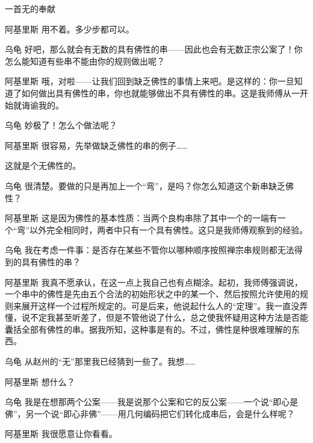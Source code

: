 \begin{dialog}{一首无的奉献\label{abcd}}
\begin{dialogue}
\item[阿基里斯]用不着。多少步都可以。

\item[乌龟]好吧，那么就会有无数的具有佛性的串——因此也会有无数正宗公案了！你怎么能知道有些串不能由你的规则做出呢？

\item[阿基里斯]哦，对啦——让我们回到缺乏佛性的事情上来吧。是这样的：你一旦知道了如何做出具有佛性的串，你也就能够做出不具有佛性的串。这是我师傅从一开始就诲谕我的。

\item[乌龟]妙极了！怎么个做法呢？

\item[阿基里斯]很容易，先举做缺乏佛性的串的例子……


这就是个无佛性的。

\item[乌龟]很清楚。要做的只是再加上一个“弯”，是吗？你怎么知道这个新串缺乏佛性？

\item[阿基里斯]这是因为佛性的基本性质：当两个良构串除了其中一个的一端有一个“弯”以外完全相同时，两者中只有一个具有佛性。这只是我师傅观察到的经验。

\item[乌龟]我在考虑一件事：是否存在某些不管你以哪种顺序按照禅宗串规则都无法得到的具有佛性的串？

\item[阿基里斯]我真不愿承认，在这一点上我自己也有点糊涂。起初，我师傅强调说，一个串中的佛性是先由五个合法的初始形状之中的某一个、然后按照允许使用的规则来展开这样一个过程所规定的。可是后来，他说起什么人的“定理”。我一直没弄懂，说不定我甚至听差了，但是不管他说了什么，总之使我怀疑用这种方法是否能囊括全部有佛性的串。据我所知，这种事是有的。不过，佛性是种很难理解的东西。

\item[乌龟]从赵州的“无”那里我已经猜到一些了。我想……

\item[阿基里斯]想什么？

\item[乌龟]我是在想那两个公案——我是说那个公案和它的反公案——一个说“即心是佛”，另一个说“即心非佛”——用几何编码把它们转化成串后，会是什么样呢？

\item[阿基里斯]我很愿意让你看看。



\end{dialogue}
\end{dialog}
